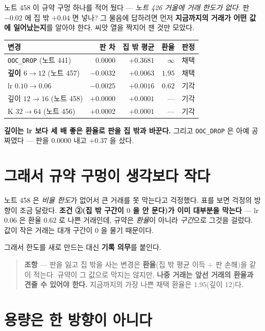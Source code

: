 \documentclass[11pt]{article}
\begin{document}
노트 458 이 규약 구멍 하나를 적어 뒀다 --- \emph{노트 426 거울에 거래
한도가 없다.} 판 $-0.02$ 에 집 밖 $+0.04$ 면 넣나? 그 물음에 답하려면
먼저 \textbf{지금까지의 거래가 어떤 값에 일어났는지}를 알아야 한다.
씨앗 열을 짝지어 잰 것만 모았다.

\begin{center}
\begin{tabular}{lrrrl}
\hline
변경 & 판 차 & 집 밖 평균 & \textbf{환율} & 판정 \\
\hline
\texttt{OOC\_DROP} (노트 441) & $0.0000$ & $+0.3681$ & $\infty$ & 채택 \\
\textbf{깊이 $6 \to 12$} (노트 457) & $-0.0032$ & $+0.0063$ & $\mathbf{1.95}$ & 채택 \\
lr $0.10 \to 0.06$ & $-0.0025$ & $+0.0016$ & $0.62$ & 기각 \\
깊이 $12 \to 16$ (노트 458) & $+0.0000$ & $+0.0001$ & --- & 기각 \\
K $32 \to 64$ (노트 456) & $+0.0002$ & $+0.0001$ & --- & 기각 \\
\hline
\end{tabular}
\end{center}

\textbf{깊이는 lr 보다 세 배 좋은 환율로 판을 집 밖과 바꾼다.} 그리고
\texttt{OOC\_DROP} 은 아예 공짜였다 --- 판을 $0.0000$ 내고
$+0.37$ 을 샀다.

\section{그래서 규약 구멍이 생각보다 작다}

노트 458 은 \emph{비율 한도}가 없어서 큰 거래를 못 막는다고 걱정했다.
표를 보면 걱정의 방향이 조금 달랐다. \textbf{조건 ②(집 밖 구간이 $0$ 을
안 문다)가 이미 대부분을 막는다} --- lr $0.06$ 은 환율 $0.62$ 로 나쁜
거래인데, 규약은 \emph{환율}이 아니라 \emph{구간}으로 그것을 걸렀다.
값이 작은 거래는 대개 구간이 $0$ 을 물기 때문이다.

그래서 한도를 새로 만드는 대신 \textbf{기록 의무}를 붙인다.

\begin{quote}
\textbf{조항} --- 판을 잃고 집 밖을 사는 변경은 \textbf{환율}(집 밖
평균 이득 $\div$ 판 손해)을 같이 적는다. 규약이 그 값으로 막지는 않지만,
\textbf{나중 거래는 앞선 거래의 환율과 견줄 수 있어야 한다.} 지금까지의
가장 나쁜 채택 환율은 $\mathbf{1.95}$(깊이 $12$)다.
\end{quote}

\section{용량은 한 방향이 아니다}
\end{document}
